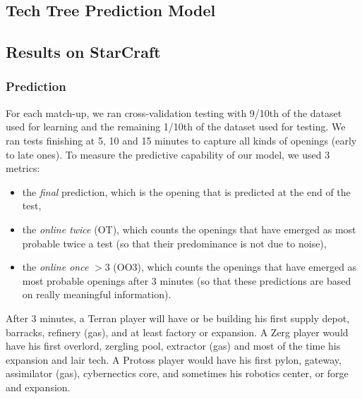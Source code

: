 \subsection{Tech Tree Prediction Model}

\subsection{Results on StarCraft}


\subsubsection{Prediction}

For each match-up, we ran cross-validation testing with 9/10th of the dataset used for learning and the remaining 1/10th of the dataset used for testing. We ran tests finishing at 5, 10 and 15 minutes to capture all kinds of openings (early to late ones). To measure the predictive capability of our model, we used 3 metrics: 
\begin{itemize}
\item the \textit{final} prediction, which is the opening that is predicted at the end of the test, 
\item the \textit{online twice} (OT), which counts the openings that have emerged as most probable twice a test (so that their predominance is not due to noise),
\item the \textit{online once} $> 3$ (OO3), which counts the openings that have emerged as most probable openings after 3 minutes (so that these predictions are based on really meaningful information).
\end{itemize}
After 3 minutes, a Terran player will have or be building his first supply depot, barracks, refinery (gas), and at least factory or expansion. A Zerg player would have his first overlord, zergling pool, extractor (gas) and most of the time his expansion and lair tech. A Protoss player would have his first pylon, gateway, assimilator (gas), cybernectics core, and sometimes his robotics center, or forge and expansion.

